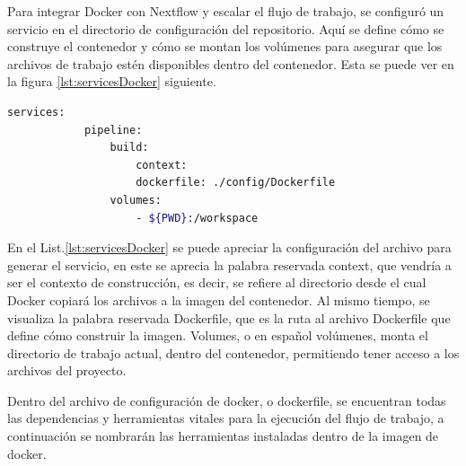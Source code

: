 \documentclass[12pt]{article}
\begin{document}
Para integrar Docker con Nextflow y escalar el 
flujo de trabajo, se configuró un servicio en el 
directorio de configuración del repositorio. Aquí se 
define cómo se construye el contenedor y cómo se montan 
los volúmenes para asegurar que los archivos de trabajo 
estén disponibles dentro del contenedor. Esta se puede ver 
en la figura \ref{lst:servicesDocker} siguiente.

\begin{center}
    \begin{lstlisting}[language=bash, caption=Código para la elaboración del servicio de docker \emph{(elaboración propia)}., label=lst:servicesDocker]
        services:
            pipeline:
                build:
                    context:
                    dockerfile: ./config/Dockerfile
                volumes:
                    - ${PWD}:/workspace
    \end{lstlisting}
\end{center}

En el List.\ref{lst:servicesDocker} se puede apreciar 
la configuración del archivo para generar el servicio, 
en este se aprecia la palabra reservada context, que 
vendría a ser el contexto de construcción, es decir, 
se refiere al directorio desde el cual Docker copiará 
los archivos a la imagen del contenedor. Al mismo tiempo, 
se visualiza la palabra reservada Dockerfile, que es la 
ruta al archivo Dockerfile que define cómo construir la 
imagen. Volumes, o en español volúmenes, monta el directorio 
de trabajo actual, dentro del contenedor, permitiendo tener 
acceso a los archivos del proyecto.

Dentro del archivo de configuración de docker, o 
dockerfile, se encuentran todas las dependencias  y 
herramientas vitales para la ejecución del flujo de 
trabajo, a continuación se nombrarán las herramientas 
instaladas dentro de la imagen de docker.
\end{document}
